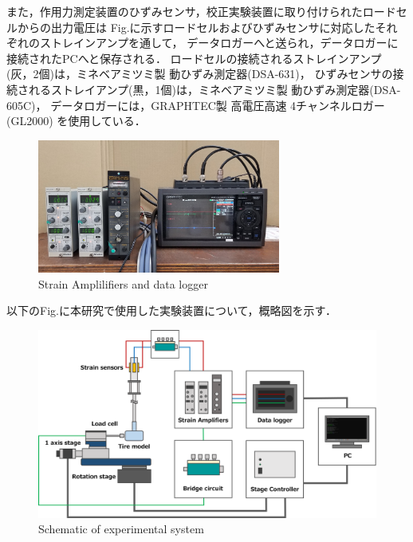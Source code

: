 \newpage

また，作用力測定装置のひずみセンサ，校正実験装置に取り付けられたロードセルからの出力電圧は
Fig.に示すロードセルおよびひずみセンサに対応したそれぞれのストレインアンプを通して，
データロガーへと送られ，データロガーに接続されたPCへと保存される．
ロードセルの接続されるストレインアンプ(灰，2個)は，ミネベアミツミ製 動ひずみ測定器(DSA-631)，
ひずみセンサの接続されるストレイアンプ(黒，1個)は，ミネベアミツミ製 動ひずみ測定器(DSA-605C)，
データロガーには，GRAPHTEC製 高電圧高速 4チャンネルロガー(GL2000) を使用している．

\begin{figure}[htbp]
    \footnotesize
    \begin{center}
        \includegraphics[width=80mm]{images/22-5.png}
        \caption{Strain Amplilifiers and data logger}
    \end{center}
\end{figure}

以下のFig.に本研究で使用した実験装置について，概略図を示す．

\begin{figure}[htbp]
    \footnotesize
    \begin{center}
        \includegraphics[width=140mm]{images/22-6.png}
        \caption{Schematic of experimental system}
    \end{center}
\end{figure}
